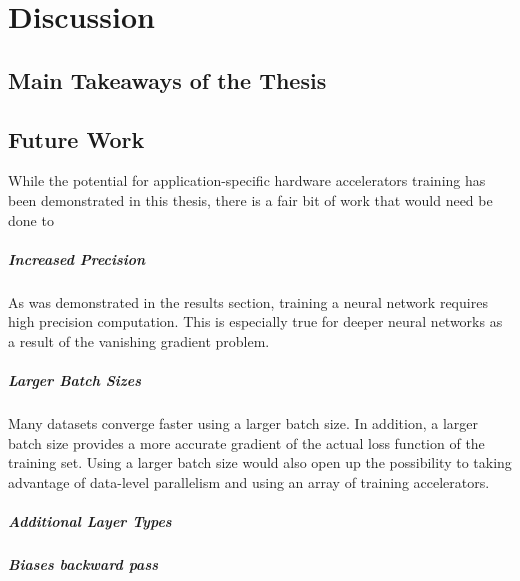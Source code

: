 \chapter{Discussion}


\section{Main Takeaways of the Thesis}

\section{Future Work}
While the potential for application-specific hardware accelerators training has been demonstrated in this thesis, there is a fair bit of work that would need be done to 

\paragraph{Increased Precision}
As was demonstrated in the results section, training a neural network requires high precision computation. This is especially true for deeper neural networks as a result of the vanishing gradient problem.

\paragraph{Larger Batch Sizes}
Many datasets converge faster using a larger batch size. In addition, a larger batch size provides a more accurate gradient of the actual loss function of the training set. Using a larger batch size would also open up the possibility to taking advantage of data-level parallelism and using an array of training accelerators. 

\paragraph{Additional Layer Types}

\paragraph{Biases backward pass}

